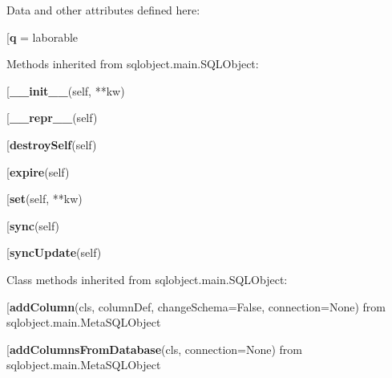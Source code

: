 Data and other attributes defined here:\\
\begin{description}\item[{\bf q} = laborable\end{description}


Methods inherited from sqlobject.main.SQLObject:\\
\begin{description}\item[{\bf \_\_init\_\_}(self, **kw)\end{description}

\begin{description}\item[{\bf \_\_repr\_\_}(self)\end{description}

\begin{description}\item[{\bf destroySelf}(self)\end{description}

\begin{description}\item[{\bf expire}(self)\end{description}

\begin{description}\item[{\bf set}(self, **kw)\end{description}

\begin{description}\item[{\bf sync}(self)\end{description}

\begin{description}\item[{\bf syncUpdate}(self)\end{description}


Class methods inherited from sqlobject.main.SQLObject:\\
\begin{description}\item[{\bf addColumn}(cls, columnDef, changeSchema=False, connection=None) from sqlobject.main.MetaSQLObject\end{description}

\begin{description}\item[{\bf addColumnsFromDatabase}(cls, connection=None) from sqlobject.main.MetaSQLObject\end{description}

